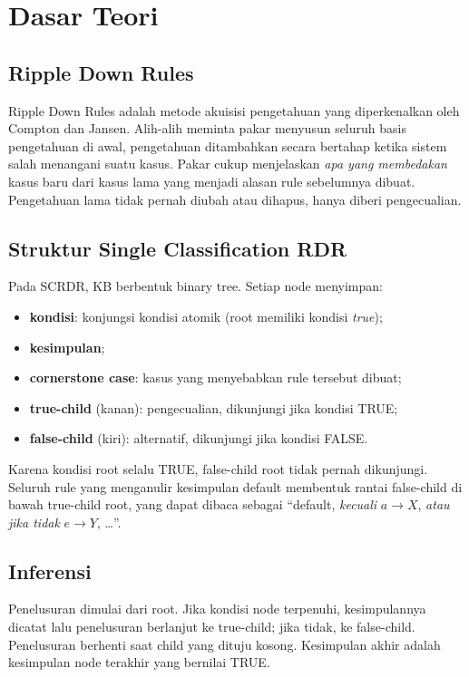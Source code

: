 \documentclass[11pt,a4paper]{article}
\begin{document}
\section{Dasar Teori}

\subsection{Ripple Down Rules}
Ripple Down Rules adalah metode akuisisi pengetahuan yang diperkenalkan oleh Compton dan
Jansen. Alih-alih meminta pakar menyusun seluruh basis pengetahuan di awal, pengetahuan
ditambahkan secara bertahap ketika sistem salah menangani suatu kasus. Pakar cukup
menjelaskan \emph{apa yang membedakan} kasus baru dari kasus lama yang menjadi alasan rule
sebelumnya dibuat. Pengetahuan lama tidak pernah diubah atau dihapus, hanya diberi
pengecualian.

\subsection{Struktur Single Classification RDR}
Pada SCRDR, KB berbentuk binary tree. Setiap node menyimpan:
\begin{itemize}[nosep]
  \item \textbf{kondisi}: konjungsi kondisi atomik (root memiliki kondisi \emph{true});
  \item \textbf{kesimpulan};
  \item \textbf{cornerstone case}: kasus yang menyebabkan rule tersebut dibuat;
  \item \textbf{true-child} (kanan): pengecualian, dikunjungi jika kondisi TRUE;
  \item \textbf{false-child} (kiri): alternatif, dikunjungi jika kondisi FALSE.
\end{itemize}

Karena kondisi root selalu TRUE, false-child root tidak pernah dikunjungi. Seluruh rule yang
menganulir kesimpulan default membentuk rantai false-child di bawah true-child root, yang dapat
dibaca sebagai ``default, \emph{kecuali} $a \rightarrow X$, \emph{atau jika tidak}
$e \rightarrow Y$, \ldots''.

\subsection{Inferensi}
Penelusuran dimulai dari root. Jika kondisi node terpenuhi, kesimpulannya dicatat lalu
penelusuran berlanjut ke true-child; jika tidak, ke false-child. Penelusuran berhenti saat
child yang dituju kosong. Kesimpulan akhir adalah kesimpulan node terakhir yang bernilai TRUE.
\end{document}
